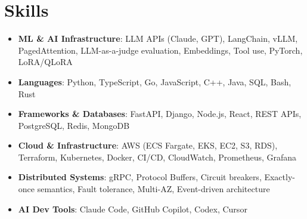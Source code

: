 \documentclass[letterpaper,11pt]{article}
\newcommand{\resumeSubHeadingListStart}{\begin{itemize}[leftmargin=0.15in, label={}]}
\newcommand{\resumeSubHeadingListEnd}{\end{itemize}}
\newcommand{\resumeSkillHeading}[2]{%
  \item\small{\textbf{#1}: #2 \vspace{-9pt}}%
}
\begin{document}
\section{Skills}
  \resumeSubHeadingListStart
    \resumeSkillHeading{ML \& AI Infrastructure}{LLM APIs (Claude, GPT), LangChain, vLLM, PagedAttention, LLM-as-a-judge evaluation, Embeddings, Tool use, PyTorch, LoRA/QLoRA}
    \resumeSkillHeading{Languages}{Python, TypeScript, Go, JavaScript, C++, Java, SQL, Bash, Rust}
    \resumeSkillHeading{Frameworks \& Databases}{FastAPI, Django, Node.js, React, REST APIs, PostgreSQL, Redis, MongoDB}
    \resumeSkillHeading{Cloud \& Infrastructure}{AWS (ECS Fargate, EKS, EC2, S3, RDS), Terraform, Kubernetes, Docker, CI/CD, CloudWatch, Prometheus, Grafana}
    \resumeSkillHeading{Distributed Systems}{gRPC, Protocol Buffers, Circuit breakers, Exactly-once semantics, Fault tolerance, Multi-AZ, Event-driven architecture}
    \resumeSkillHeading{AI Dev Tools}{Claude Code, GitHub Copilot, Codex, Cursor}
  \resumeSubHeadingListEnd
\end{document}
